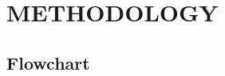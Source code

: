 \documentclass[report.tex]{subfiles}
\begin{document}
    \section{METHODOLOGY}
    \subsection{Flowchart}
\end{document}
